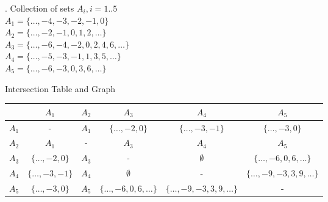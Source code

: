 \documentclass[12pt]{article}
\newenvironment{problem}[2][Problem]{\begin{trivlist}
\item[\hskip \labelsep {\bfseries #1}\hskip \labelsep {\bfseries #2.}]}{\end{trivlist}}
\begin{document}
\begin{problem}{1}
\begin{center}
\end{center}
. Collection of sets $A_i, i=1..5$\\
$A_1 = \{\ldots,-4,-3,-2,-1,0\}$\\
$A_2 = \{\ldots,-2,-1,0,1,2,\ldots\}$\\
$A_3 = \{\ldots,-6,-4,-2,0,2,4,6,\ldots\}$\\
$A_4 = \{\ldots,-5,-3,-1,1,3,5,\ldots\}$\\
$A_5 = \{\ldots,-6,-3,0,3,6,\ldots\}$
\begin{center}
    Intersection Table and Graph\\
    \begin{tabular}{|c|c|c|c|c|c|} 
     \hline
      & $A_1$ & $A_2$ & $A_3$ & $A_4$ & $A_5$\\
     \hline
     $A_1$ & - & $A_1$ & $\{\ldots, -2, 0\}$ & $\{\ldots, -3, -1\}$& $\{\ldots, -3, 0\}$\\ 
     $A_2$ & $A_1$ & - & $A_3$ & $A_4$ & $A_5$\\
     $A_3$ & $\{\ldots, -2, 0\}$ & $A_3$ & - & $\emptyset$ & $\{\ldots, -6, 0, 6, \ldots\}$\\
     $A_4$ & $\{\ldots, -3, -1\}$ & $A_4$ & $\emptyset$ & - & $\{\ldots, -9, -3, 3, 9, \ldots\}$ \\
     $A_5$ & $\{\ldots, -3, 0\}$ & $A_5$ & $\{\ldots, -6, 0, 6, \ldots\}$ & $\{\ldots, -9, -3, 3, 9, \ldots\}$ & - \\
     \hline
    \end{tabular}

\end{center}
\end{problem}
\end{document}
